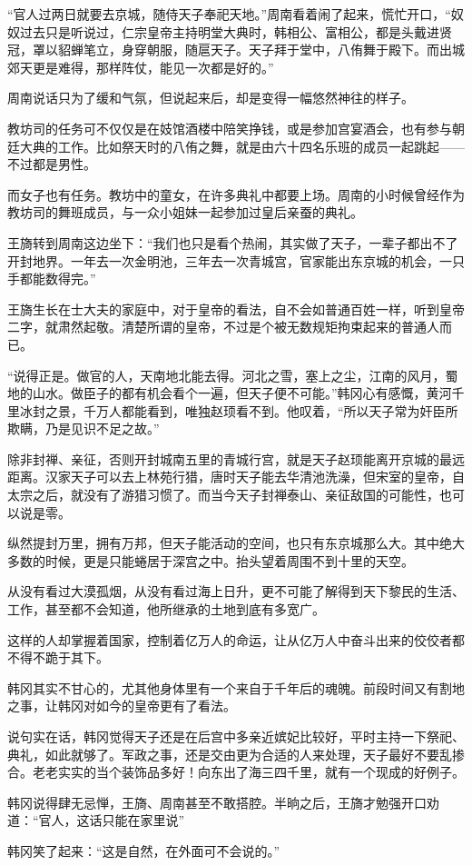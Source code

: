 “官人过两日就要去京城，随侍天子奉祀天地。”周南看着闹了起来，慌忙开口，“奴奴过去只是听说过，仁宗皇帝主持明堂大典时，韩相公、富相公，都是头戴进贤冠，罩以貂蝉笔立，身穿朝服，随扈天子。天子拜于堂中，八侑舞于殿下。而出城郊天更是难得，那样阵仗，能见一次都是好的。”

周南说话只为了缓和气氛，但说起来后，却是变得一幅悠然神往的样子。

教坊司的任务可不仅仅是在妓馆酒楼中陪笑挣钱，或是参加宫宴酒会，也有参与朝廷大典的工作。比如祭天时的八侑之舞，就是由六十四名乐班的成员一起跳起——不过都是男性。

而女子也有任务。教坊中的童女，在许多典礼中都要上场。周南的小时候曾经作为教坊司的舞班成员，与一众小姐妹一起参加过皇后亲蚕的典礼。

王旖转到周南这边坐下：“我们也只是看个热闹，其实做了天子，一辈子都出不了开封地界。一年去一次金明池，三年去一次青城宫，官家能出东京城的机会，一只手都能数得完。”

王旖生长在士大夫的家庭中，对于皇帝的看法，自不会如普通百姓一样，听到皇帝二字，就肃然起敬。清楚所谓的皇帝，不过是个被无数规矩拘束起来的普通人而已。

“说得正是。做官的人，天南地北能去得。河北之雪，塞上之尘，江南的风月，蜀地的山水。做臣子的都有机会看个一遍，但天子便不可能。”韩冈心有感慨，黄河千里冰封之景，千万人都能看到，唯独赵顼看不到。他叹着，“所以天子常为奸臣所欺瞒，乃是见识不足之故。”

除非封禅、亲征，否则开封城南五里的青城行宫，就是天子赵顼能离开京城的最远距离。汉家天子可以去上林苑行猎，唐时天子能去华清池洗澡，但宋室的皇帝，自太宗之后，就没有了游猎习惯了。而当今天子封禅泰山、亲征敌国的可能性，也可以说是零。

纵然提封万里，拥有万邦，但天子能活动的空间，也只有东京城那么大。其中绝大多数的时候，更是只能蜷居于深宫之中。抬头望着周围不到十里的天空。

从没有看过大漠孤烟，从没有看过海上日升，更不可能了解得到天下黎民的生活、工作，甚至都不会知道，他所继承的土地到底有多宽广。

这样的人却掌握着国家，控制着亿万人的命运，让从亿万人中奋斗出来的佼佼者都不得不跪于其下。

韩冈其实不甘心的，尤其他身体里有一个来自于千年后的魂魄。前段时间又有割地之事，让韩冈对如今的皇帝更有了看法。

说句实在话，韩冈觉得天子还是在后宫中多亲近嫔妃比较好，平时主持一下祭祀、典礼，如此就够了。军政之事，还是交由更为合适的人来处理，天子最好不要乱掺合。老老实实的当个装饰品多好！向东出了海三四千里，就有一个现成的好例子。

韩冈说得肆无忌惮，王旖、周南甚至不敢搭腔。半晌之后，王旖才勉强开口劝道：“官人，这话只能在家里说”

韩冈笑了起来：“这是自然，在外面可不会说的。”

